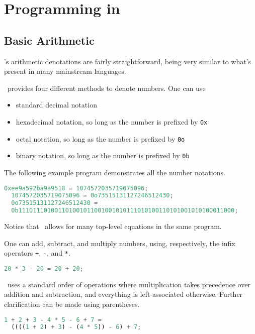 \section{Programming in \vampir}

\subsection{Basic Arithmetic}

\vampir's arithmetic denotations are fairly straightforward, being very similar to what's present in many mainstream languages.

\vampir\ provides four different methods to denote numbers. One can use

\begin{itemize}
  \item standard decimal notation
  \item hexadecimal notation, so long as the number is prefixed by \lstinline{0x}
  \item octal notation, so long as the number is prefixed by \lstinline{0o}
  \item binary notation, so long as the number is prefixed by \lstinline{0b}
\end{itemize}

The following example program demonstrates all the number notations.

\begin{lstlisting}[language=Python]
  0xee9a592ba9a9518 = 1074572035719075096;
  1074572035719075096 = 0o73515131127246512430;
  0o73515131127246512430 =
  0b111011101001101001011001001010111010100110101001010100011000;
\end{lstlisting}

Notice that \vampir\ allows for many top-level equations in the same program.

One can add, subtract, and multiply numbers, using, respectively, the infix operators \lstinline{+}, \lstinline{-}, and \lstinline{*}.

\begin{lstlisting}[language=Python]
  20 * 3 - 20 = 20 + 20;
\end{lstlisting}

\vampir\ uses a standard order of operations where multiplication takes precedence over addition and subtraction, and everything is left-associated otherwise. Further clarification can be made using parentheses.

\begin{lstlisting}[language=Python]
  1 + 2 + 3 - 4 * 5 - 6 + 7 =
  ((((1 + 2) + 3) - (4 * 5)) - 6) + 7;
\end{lstlisting}

